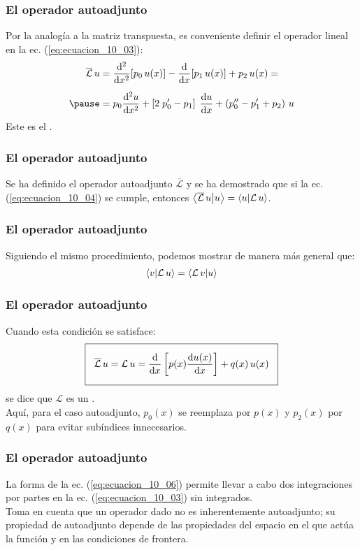 \documentclass[12pt]{beamer}
\begin{document}
\begin{frame}
\frametitle{El operador autoadjunto}
Por la analogía a la matriz transpuesta, es conveniente definir el operador lineal en la ec. (\ref{eq:ecuacion_10_03}):
\pause
\begin{eqnarray}
\begin{aligned}[b]
\overline{\mathcal{L}} \, u &= \dv[2]{x} [ p_{0} \, u (x)] - \dv{x} [p_{1} \, u (x)] + p_{2} \, u (x) = \\[0.5em] \pause
&= p_{0} \dv[2]{u}{x} + \left[ 2 \; \pderivada{p}_{0} - p_{1} \right] \; \dv{u}{x} + \left( \sderivada{p}_{0} - \pderivada{p}_{1} + p_{2} \right) \, u
\label{eq:ecuacion_10_05}
\end{aligned}
\end{eqnarray}
Este es el .
\end{frame}
\begin{frame}
\frametitle{El operador autoadjunto}
Se ha definido el operador autoadjunto $\overline{\mathcal{L}}$ y se ha demostrado que si la ec. (\ref{eq:ecuacion_10_04}) se cumple, entonces $\ip{\overline{\mathcal{L}} \, u}{u} = \ip{u}{\mathcal{L} \, u}$.
\end{frame}
\begin{frame}
\frametitle{El operador autoadjunto}
Siguiendo el mismo procedimiento, podemos mostrar de manera más general que:
\pause
\begin{align*}
\ip{v}{\mathcal{L} \, u} = \ip{\mathcal{L} \, v}{u}
\end{align*}
\end{frame}
\begin{frame}
\frametitle{El operador autoadjunto}
Cuando esta condición se satisface:
\pause
\begin{equation}
\setlength{\fboxsep}{3\fboxsep}\boxed{\overline{
\mathcal{L}} \, u = \mathcal{L} \, u = \dv{x} \left[ p (x) \dv{u (x)}{x} \right] + q (x) \, u (x)}
\label{eq:ecuacion_10_06}
\end{equation}
\pause
se dice que $\mathcal{L}$ es un . 
\\
\bigskip
\pause
Aquí, para el caso autoadjunto, $p_{0} (x)$ se reemplaza por $p (x)$ y $p_{2} (x)$ por $q (x)$ para evitar subíndices innecesarios.
\end{frame}
\begin{frame}
\frametitle{El operador autoadjunto}
La forma de la ec. (\ref{eq:ecuacion_10_06}) permite llevar a cabo dos integraciones por partes en la ec. (\ref{eq:ecuacion_10_03}) sin integrados.
\\
\bigskip
\pause
Toma en cuenta que un operador dado no es inherentemente autoadjunto; su propiedad de autoadjunto depende de las propiedades del espacio en el que actúa la función y en las condiciones de frontera.
\end{frame}
\end{document}
